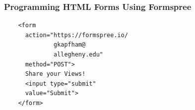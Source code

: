 \documentclass[14pt,aspectratio=169]{beamer}
\begin{document}
%
\begin{frame}[fragile]
  \frametitle{Programming HTML Forms Using Formspree}
  \normalsize
  \begin{minipage}{6in}
    \vspace*{.1in}
    \begin{verbatim}
    <form
      action="https://formspree.io/
              gkapfham@
              allegheny.edu"
      method="POST">
      Share your Views!
      <input type="submit"
      value="Submit">
    </form>
    \end{verbatim}
  \end{minipage}
\end{frame}
\end{document}
